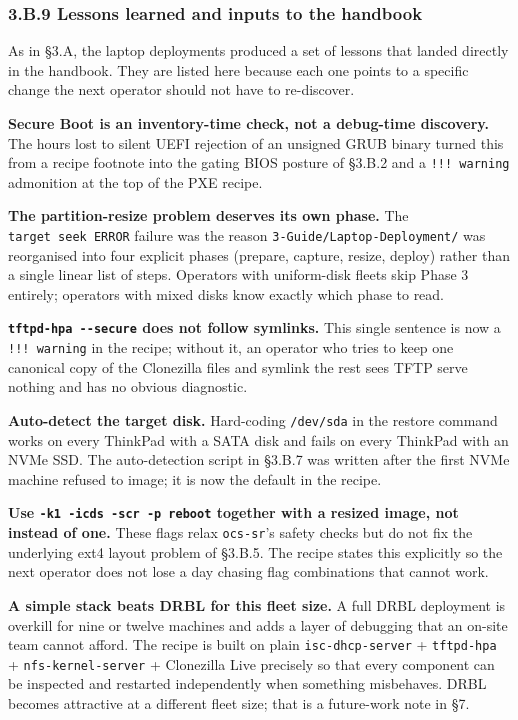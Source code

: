 \hypertarget{b.9-lessons-learned-and-inputs-to-the-handbook}{%
\subsubsection{3.B.9 Lessons learned and inputs to the
handbook}\label{b.9-lessons-learned-and-inputs-to-the-handbook}}

As in §3.A, the laptop deployments produced a set of lessons that landed
directly in the handbook. They are listed here because each one points
to a specific change the next operator should not have to re-discover.

\textbf{Secure Boot is an inventory-time check, not a debug-time
discovery.} The hours lost to silent UEFI rejection of an unsigned GRUB
binary turned this from a recipe footnote into the gating BIOS posture
of §3.B.2 and a \texttt{!!!\ warning} admonition at the top of the PXE
recipe.

\textbf{The partition-resize problem deserves its own phase.} The
\texttt{target\ seek\ ERROR} failure was the reason
\texttt{3-Guide/Laptop-Deployment/} was reorganised into four explicit
phases (prepare, capture, resize, deploy) rather than a single linear
list of steps. Operators with uniform-disk fleets skip Phase 3 entirely;
operators with mixed disks know exactly which phase to read.

\textbf{\texttt{tftpd-hpa\ -\/-secure} does not follow symlinks.} This
single sentence is now a \texttt{!!!\ warning} in the recipe; without
it, an operator who tries to keep one canonical copy of the Clonezilla
files and symlink the rest sees TFTP serve nothing and has no obvious
diagnostic.

\textbf{Auto-detect the target disk.} Hard-coding \texttt{/dev/sda} in
the restore command works on every ThinkPad with a SATA disk and fails
on every ThinkPad with an NVMe SSD. The auto-detection script in §3.B.7
was written after the first NVMe machine refused to image; it is now the
default in the recipe.

\textbf{Use \texttt{-k1\ -icds\ -scr\ -p\ reboot} together with a
resized image, not instead of one.} These flags relax \texttt{ocs-sr}'s
safety checks but do not fix the underlying ext4 layout problem of
§3.B.5. The recipe states this explicitly so the next operator does not
lose a day chasing flag combinations that cannot work.

\textbf{A simple stack beats DRBL for this fleet size.} A full DRBL
deployment is overkill for nine or twelve machines and adds a layer of
debugging that an on-site team cannot afford. The recipe is built on
plain \texttt{isc-dhcp-server} + \texttt{tftpd-hpa} +
\texttt{nfs-kernel-server} + Clonezilla Live precisely so that every
component can be inspected and restarted independently when something
misbehaves. DRBL becomes attractive at a different fleet size; that is a
future-work note in §7.

